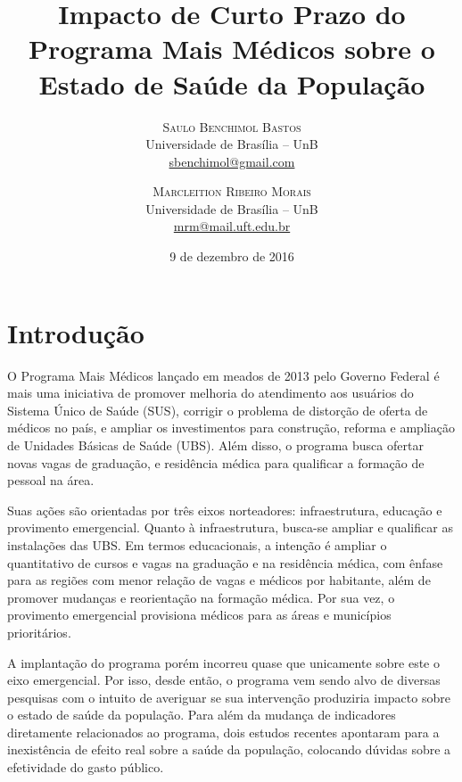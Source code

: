 \documentclass[twoside,onecolumn,12pt]{article}
\title{Impacto de Curto Prazo do Programa Mais M\'{e}dicos sobre o Estado de Saúde da População}
\author{
      \textsc{Saulo Benchimol Bastos} \\[-1mm] %
      \normalsize Universidade de Bras\'{i}lia -- UnB \\[-1mm] %
      \normalsize \href{mailto:sbenchimol@gmail.com}{sbenchimol@gmail.com} %
  \and %
      \textsc{Marcleition Ribeiro Morais} \\[-1mm] %
      \normalsize Universidade de Bras\'{i}lia -- UnB \\[-1mm] %
      \normalsize \href{mailto:mrm@mail.uft.edu.br}{mrm@mail.uft.edu.br} %
}
\date{9 de dezembro de 2016}
\numberwithin{outputctr}{section}
\begin{document}
\maketitle



\section{Introdu\c{c}\~{a}o \label{secIntroducao}}


O Programa Mais Médicos lançado em meados de 2013 pelo Governo Federal é mais uma iniciativa de promover melhoria do atendimento aos usu\'{a}rios do Sistema \'{U}nico de Sa\'{u}de (SUS), corrigir o problema de distorção de oferta de médicos no país, e ampliar os investimentos para constru\c{c}\~{a}o, reforma e amplia\c{c}\~{a}o de Unidades B\'{a}sicas de Sa\'{u}de (UBS). Além disso, o programa busca ofertar novas vagas de gradua\c{c}\~{a}o, e resid\^{e}ncia m\'{e}dica para qualificar a forma\c{c}\~{a}o de pessoal na área.

Suas ações são orientadas por três eixos norteadores: infraestrutura, educação e provimento emergencial. Quanto à infraestrutura, busca-se ampliar e qualificar as instala\c{c}\~{o}es das UBS. Em termos educacionais, a intenção é ampliar o quantitativo de cursos e vagas na gradua\c{c}\~{a}o e na resid\^{e}ncia m\'{e}dica, com \^{e}nfase para as regi\~{o}es com menor rela\c{c}\~{a}o de vagas e m\'{e}dicos por habitante, al\'{e}m de promover mudan\c{c}as e reorienta\c{c}\~{a}o na forma\c{c}\~{a}o m\'{e}dica. Por sua vez, o provimento emergencial provisiona m\'{e}dicos para as \'{a}reas e munic\'{i}pios priorit\'{a}rios.

A implantação do programa porém incorreu quase que unicamente sobre este o eixo emergencial. Por isso, desde então, o programa vem sendo alvo de diversas pesquisas com o intuito de averiguar se sua intervenção produziria impacto sobre o estado de saúde da população. Para além da mudança de indicadores diretamente relacionados ao programa, dois estudos recentes apontaram para a inexistência de efeito real sobre a saúde da população, colocando dúvidas sobre a efetividade do gasto público.
\end{document}
